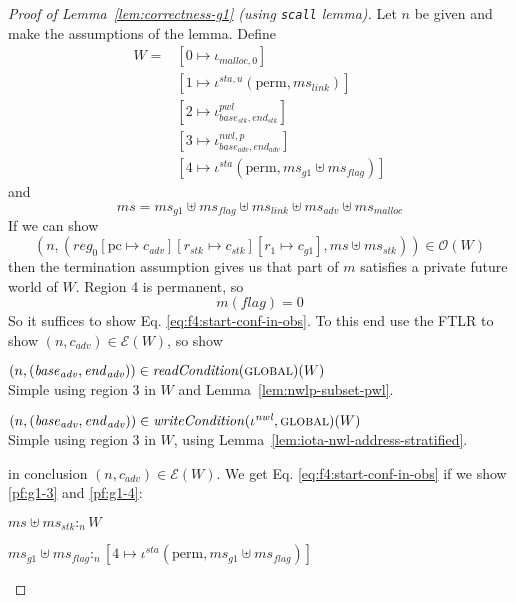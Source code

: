\documentclass[a4paper]{article}
\newcommand{\update}[2]{[#1 \mapsto #2]}
\newcommand{\var}[1]{\mathit{#1}}
\newcommand{\hs}{\var{ms}}
\newcommand{\ms}{\hs}
\newcommand{\pcreg}{\mathrm{pc}}
\newcommand{\start}{\var{base}}
\newcommand{\addrend}{\var{end}}
\newcommand{\reg}{\var{reg}}
\newcommand{\heap}{\var{mem}}
\newcommand{\adv}{\var{adv}}
\newcommand{\link}{\var{link}}
\newcommand{\stk}{\var{stk}}
\newcommand{\flag}{\var{flag}}
\newcommand{\nwl}{\var{nwl}}
\newcommand{\pwl}{\var{pwl}}
\newcommand{\sta}{\var{sta}}
\newcommand{\plainfun}[2]{
  \ifthenelse{\equal{#2}{}}
  {\mathit{#1}}
  {\mathit{#1}(#2)}
}
\newcommand{\readCond}[1]{\plainfun{readCondition}{#1}}
\newcommand{\writeCond}[1]{\plainfun{writeCondition}{#1}}
\newcommand{\heapSat}[3][\heap]{#1 :_{#2} #3}
\newcommand{\memSat}[3][n]{\heapSat[#2]{#1}{#3}}
\newcommand{\codelabel}[1]{\mathit{#1}}
\newcommand{\malloc}{\codelabel{malloc}}
\newcommand{\asmType}{\plaindom{AsmType}}
\newcommand{\plaindom}[1]{\mathrm{#1}}
\newcommand{\intr}[2]{\mathcal{#1}}
\newcommand{\exprintr}[1]{\intr{E}{#1}}
\newcommand{\stder}{\exprintr{\asmType}}
\newcommand{\observations}{\mathcal{O}}
\newcommand{\npair}[2][n]{\left(#1,#2 \right)}
\newcommand{\plainperm}[1]{\textsc{#1}}
\newcommand{\glob}{\plainperm{global}}
\newcommand{\plainview}[1]{\mathrm{#1}}
\newcommand{\perma}{\plainview{perm}}
\begin{document}
\begin{proof}[Proof of Lemma~\ref{lem:correctness-g1} (using \texttt{scall} lemma)]
  Let $n$ be given and make the assumptions of the lemma. Define
  \begin{align*}
    W = & [0 \mapsto \iota_{\malloc,0}]\\
        & [1 \mapsto \iota^{\sta,u} (\perma,\ms_\link)]\\
        & [2 \mapsto \iota^\pwl_{\start_\stk, \addrend_\stk}]\\
        & [3 \mapsto \iota^{\nwl,p}_{\start_\adv,\addrend_\adv}]\\
        & [4 \mapsto \iota^\sta (\perma,\ms_{g1} \uplus \ms_\flag)]
  \end{align*}
  and
  \[
    \ms = \ms_{g1} \uplus 
          \ms_\flag \uplus                
          \ms_\link \uplus 
          \ms_\adv \uplus 
          \ms_\malloc 
  \]
  If we can show
  \begin{equation}
    \label{eq:f4:start-conf-in-obs}
        \npair{(\reg_0\update{\pcreg}{c_\adv}\update{r_\stk}{c_\stk}\update{r_1}{c_{g1}},\ms \uplus \ms_\stk)} \in \observations(W)
  \end{equation}
  then the termination assumption gives us that part of $m$ satisfies a private future world of $W$. Region 4 is permanent, so
  \[
    m(\flag) = 0
  \]
  So it suffices to show Eq. \ref{eq:f4:start-conf-in-obs}. 
  To this end use the FTLR to show $\npair{c_\adv} \in \stder(W)$, so show
  \begin{enumproof}
    \item $\npair{(\start_\adv,\addrend_\adv)} \in \readCond{}(\glob)(W)$\\
      Simple using region $3$ in $W$ and Lemma~\ref{lem:nwlp-subset-pwl}.
    \item $\npair{(\start_\adv,\addrend_\adv)} \in \writeCond{}(\iota^\nwl,\glob)(W)$\\
      Simple using region $3$ in $W$, using
      Lemma~\ref{lem:iota-nwl-address-stratified}.
  \end{enumproof}
  in conclusion $\npair{c_\adv} \in \stder(W)$. We get Eq. \ref{eq:f4:start-conf-in-obs} if we show \ref{pf:g1-3} and \ref{pf:g1-4}:
  \begin{enumproof}[resume]
    \item $\memSat{\ms \uplus \ms_\stk}{W}$ \label{pf:g1-3}\\
      \begin{enumproof}
        \item $\memSat{\ms_{g1} \uplus \ms_\flag}{[4 \mapsto \iota^\sta (\perma,\ms_{g1} \uplus \ms_\flag)]}$ \label{pf:g1-3-1}\\

\end{enumproof}
\end{enumproof}
\end{proof}
\end{document}
